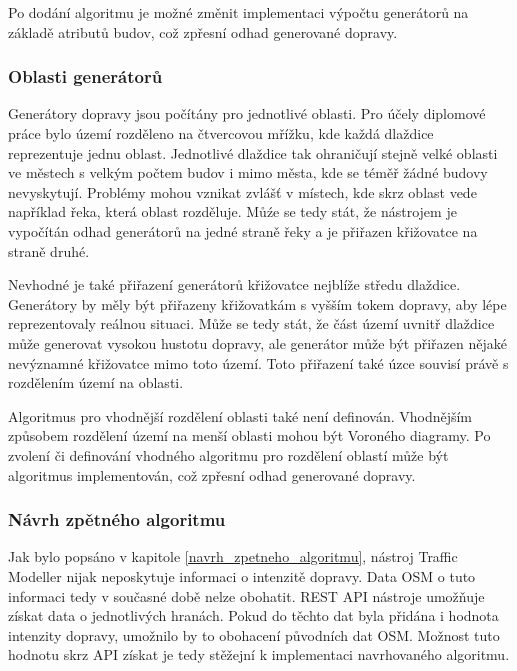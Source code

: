 Po dodání algoritmu je možné změnit implementaci výpočtu generátorů na základě atributů budov, což zpřesní odhad generované dopravy. 

\subsubsection{Oblasti generátorů}

Generátory dopravy jsou počítány pro jednotlivé oblasti. Pro účely diplomové práce bylo území rozděleno na čtvercovou mřížku, kde každá dlaždice reprezentuje jednu oblast. Jednotlivé dlaždice tak ohraničují stejně velké oblasti ve městech s velkým počtem budov i mimo města, kde se téměř žádné budovy nevyskytují. Problémy mohou vznikat zvlášť v místech, kde skrz oblast vede například řeka, která oblast rozděluje. Můźe se tedy stát, že nástrojem je vypočítán odhad generátorů na jedné straně řeky a je přiřazen křižovatce na straně druhé.

Nevhodné je také přiřazení generátorů křižovatce nejblíže středu dlaždice. Generátory by měly být přiřazeny křižovatkám s vyšším tokem dopravy, aby lépe reprezentovaly reálnou situaci. Může se tedy stát, že část území uvnitř dlaždice může generovat vysokou hustotu dopravy, ale generátor může být přiřazen nějaké nevýznamné křižovatce mimo toto území. Toto přiřazení také úzce souvisí právě s rozdělením území na oblasti. 

Algoritmus pro vhodnější rozdělení oblasti také není definován. Vhodnějším způsobem rozdělení území na menší oblasti mohou být Voroného diagramy. Po zvolení či definování vhodného algoritmu pro rozdělení oblastí může být algoritmus implementován, což zpřesní odhad generované dopravy.

\subsubsection{Návrh zpětného algoritmu}

Jak bylo popsáno v kapitole \ref{navrh_zpetneho_algoritmu}, nástroj Traffic Modeller nijak neposkytuje informaci o intenzitě dopravy. Data OSM o tuto informaci tedy v současné době nelze obohatit. REST API nástroje umožňuje získat data o jednotlivých hranách. Pokud do těchto dat byla přidána i hodnota intenzity dopravy, umožnilo by to obohacení původních dat OSM. Možnost tuto hodnotu skrz API získat je tedy stěžejní k implementaci navrhovaného algoritmu.





















